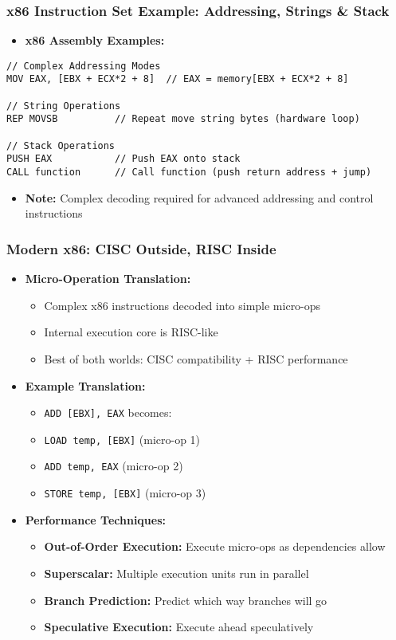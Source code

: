 \begin{frame}[fragile]
\frametitle{x86 Instruction Set Example: Addressing, Strings \& Stack}
    \begin{itemize}
        \item \textbf{x86 Assembly Examples:}
    \end{itemize}
\begin{verbatim}
// Complex Addressing Modes
MOV EAX, [EBX + ECX*2 + 8]  // EAX = memory[EBX + ECX*2 + 8]

// String Operations
REP MOVSB          // Repeat move string bytes (hardware loop)

// Stack Operations
PUSH EAX           // Push EAX onto stack
CALL function      // Call function (push return address + jump)
\end{verbatim}
\begin{itemize}
    \item \textbf{Note:} Complex decoding required for advanced addressing and control instructions
\end{itemize}
\end{frame}

\begin{frame}
\frametitle{Modern x86: CISC Outside, RISC Inside}
\begin{itemize}
    \item \textbf{Micro-Operation Translation:}
    \begin{itemize}
        \item Complex x86 instructions decoded into simple micro-ops
        \item Internal execution core is RISC-like
        \item Best of both worlds: CISC compatibility + RISC performance
    \end{itemize}
    \item \textbf{Example Translation:}
    \begin{itemize}
        \item \texttt{ADD [EBX], EAX} becomes:
        \item \texttt{LOAD temp, [EBX]} (micro-op 1)
        \item \texttt{ADD temp, EAX} (micro-op 2)  
        \item \texttt{STORE temp, [EBX]} (micro-op 3)
    \end{itemize}
    \item \textbf{Performance Techniques:}
    \begin{itemize}
        \item \textbf{Out-of-Order Execution:} Execute micro-ops as dependencies allow
        \item \textbf{Superscalar:} Multiple execution units run in parallel
        \item \textbf{Branch Prediction:} Predict which way branches will go
        \item \textbf{Speculative Execution:} Execute ahead speculatively
    \end{itemize}
\end{itemize}
\end{frame}

